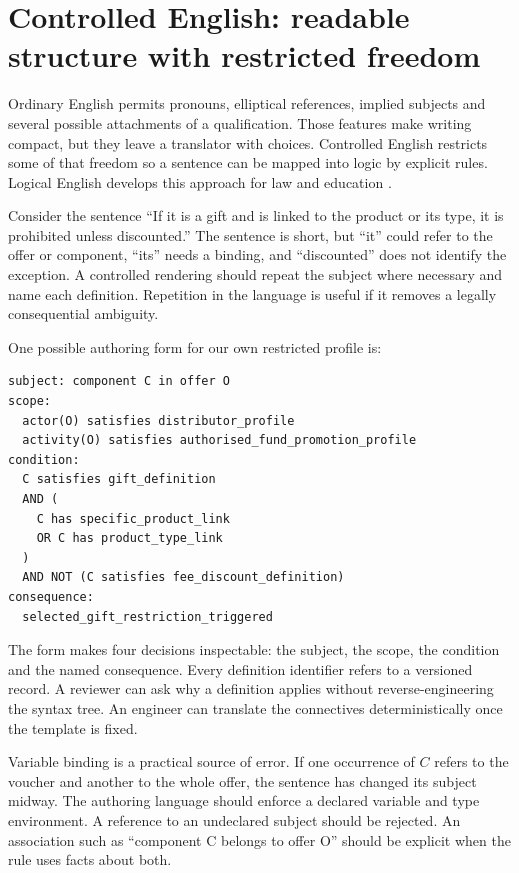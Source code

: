 \section{Controlled English: readable structure with restricted freedom}
\label{merge:M04:02}

\label{sec:languages-logicalenglish}
Ordinary English permits pronouns, elliptical references, implied subjects and
several possible attachments of a qualification. Those features make writing
compact, but they leave a translator with choices. Controlled English restricts
some of that freedom so a sentence can be mapped into logic by explicit rules.
Logical English develops this approach for law and education
\citep[language specification and examples]{logicalenglish2023}.

Consider the sentence ``If it is a gift and is linked to the product or its
type, it is prohibited unless discounted.'' The sentence is short, but ``it''
could refer to the offer or component, ``its'' needs a binding, and ``discounted''
does not identify the exception. A controlled rendering should repeat the
subject where necessary and name each definition. Repetition in the language
is useful if it removes a legally consequential ambiguity.

One possible authoring form for our own restricted profile is:
\begin{lstlisting}[caption={Illustrative LegalMath authoring notation. This is a proposed template, not claimed to be valid Logical English or Catala source.}]
subject: component C in offer O
scope:
  actor(O) satisfies distributor_profile
  activity(O) satisfies authorised_fund_promotion_profile
condition:
  C satisfies gift_definition
  AND (
    C has specific_product_link
    OR C has product_type_link
  )
  AND NOT (C satisfies fee_discount_definition)
consequence:
  selected_gift_restriction_triggered
\end{lstlisting}
The form makes four decisions inspectable: the subject, the scope, the
condition and the named consequence. Every definition identifier refers to
a versioned record. A reviewer can ask why a definition applies without
reverse-engineering the syntax tree. An engineer can translate the connectives
deterministically once the template is fixed.


Variable binding is a practical source of error. If one occurrence of $C$
refers to the voucher and another to the whole offer, the sentence has changed
its subject midway. The authoring language should enforce a declared variable
and type environment. A reference to an undeclared subject should be rejected.
An association such as ``component C belongs to offer O'' should be explicit
when the rule uses facts about both.

